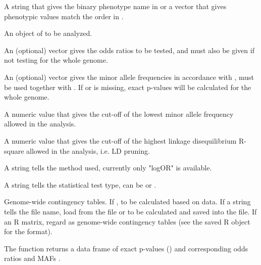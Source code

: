 \documentclass[a4paper]{book}
\begin{document}
\begin{Arguments}
\begin{ldescription}
\item[\code{pheno}] A string that gives the binary phenotype name in  or
a vector that gives phenotypic values match the order in .

\item[\code{gwaa.object}] An object of  to be analyzed.

\item[\code{or}] An (optional) vector gives the odds ratios to be tested, and  must
also be given if not testing for the whole genome.

\item[\code{or.maf}] An (optional) vector gives the minor allele frequencies in accordance with
, must be used together with . If  or 
is missing, exact p-values will be calculated for the whole genome.

\item[\code{low.maf}] A numeric value that gives the cut-off of the lowest minor allele frequency
allowed in the analysis.

\item[\code{high.ld}] A numeric value that gives the cut-off of the highest linkage disequilibrium R-square
allowed in the analysis, i.e. LD pruning.

\item[\code{method}] A string tells the method used, currently only "logOR" is available.

\item[\code{type}] A string tells the statistical test type, can be  or .

\item[\code{con.table}] Genome-wide contingency tables. If , to be calculated based on data.
If a string tells the file name, load from the file or to be calculated and saved into the file. If an R
matrix, regard as genome-wide contingency tables (see the saved R object for the format).
\end{ldescription}
\end{Arguments}
%
\begin{Value}
The function returns a data frame of exact p-values () and corresponding odds
ratios  and MAFs .
\end{Value}
\end{document}
